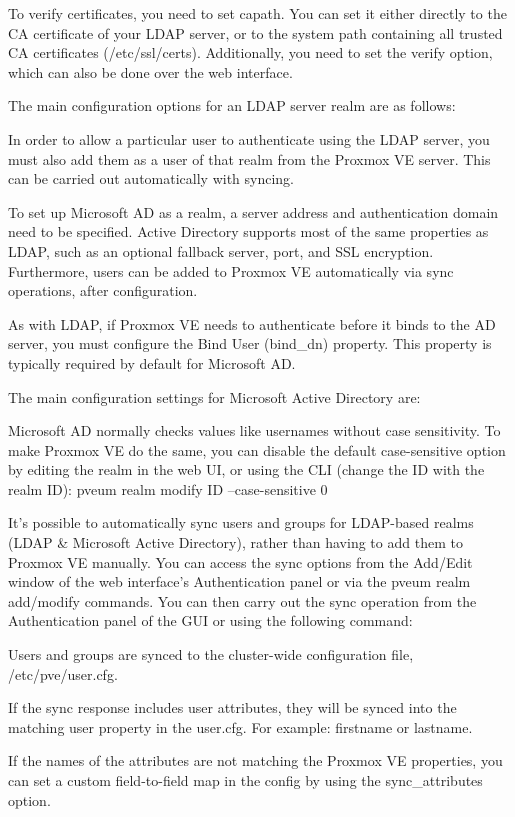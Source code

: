 To verify certificates, you need to set capath. You can set it either directly to the CA certificate of your LDAP server, or to the system path containing all trusted CA certificates (/etc/ssl/certs). Additionally, you need to set the verify option, which can also be done over the web interface.

The main configuration options for an LDAP server realm are as follows:

In order to allow a particular user to authenticate using the LDAP server, you must also add them as a user of that realm from the Proxmox VE server. This can be carried out automatically with syncing.

To set up Microsoft AD as a realm, a server address and authentication domain need to be specified. Active Directory supports most of the same properties as LDAP, such as an optional fallback server, port, and SSL encryption. Furthermore, users can be added to Proxmox VE automatically via sync operations, after configuration.

As with LDAP, if Proxmox VE needs to authenticate before it binds to the AD server, you must configure the Bind User (bind_dn) property. This property is typically required by default for Microsoft AD.

The main configuration settings for Microsoft Active Directory are:

Microsoft AD normally checks values like usernames without case sensitivity. To make Proxmox VE do the same, you can disable the default case-sensitive option by editing the realm in the web UI, or using the CLI (change the ID with the realm ID): pveum realm modify ID --case-sensitive 0

It’s possible to automatically sync users and groups for LDAP-based realms (LDAP & Microsoft Active Directory), rather than having to add them to Proxmox VE manually. You can access the sync options from the Add/Edit window of the web interface’s Authentication panel or via the pveum realm add/modify commands. You can then carry out the sync operation from the Authentication panel of the GUI or using the following command:

Users and groups are synced to the cluster-wide configuration file, /etc/pve/user.cfg.

If the sync response includes user attributes, they will be synced into the matching user property in the user.cfg. For example: firstname or lastname.

If the names of the attributes are not matching the Proxmox VE properties, you can set a custom field-to-field map in the config by using the sync_attributes option.

